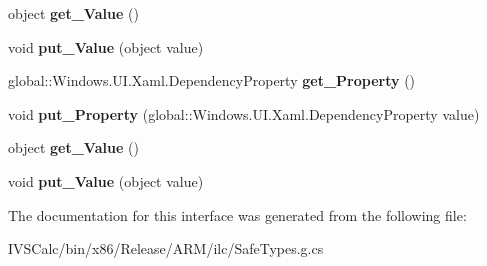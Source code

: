 \begin{DoxyCompactItemize}
object {\bfseries get\+\_\+\+Value} ()
\item 
\mbox{\label{interface_windows_1_1_u_i_1_1_xaml_1_1_i_setter_a222ce9a11d2ca442e2176a98682d4ff0}} 
void {\bfseries put\+\_\+\+Value} (object value)
\item 
\mbox{\label{interface_windows_1_1_u_i_1_1_xaml_1_1_i_setter_a3caf5fdfe02e38278e49afff4712f70c}} 
global\+::\+Windows.\+U\+I.\+Xaml.\+Dependency\+Property {\bfseries get\+\_\+\+Property} ()
\item 
\mbox{\label{interface_windows_1_1_u_i_1_1_xaml_1_1_i_setter_ab28bb64021366fee0d6ff823631c77ba}} 
void {\bfseries put\+\_\+\+Property} (global\+::\+Windows.\+U\+I.\+Xaml.\+Dependency\+Property value)
\item 
\mbox{\label{interface_windows_1_1_u_i_1_1_xaml_1_1_i_setter_a6f3c52ea80a2e55872c6f70db27a650d}} 
object {\bfseries get\+\_\+\+Value} ()
\item 
\mbox{\label{interface_windows_1_1_u_i_1_1_xaml_1_1_i_setter_a222ce9a11d2ca442e2176a98682d4ff0}} 
void {\bfseries put\+\_\+\+Value} (object value)
\end{DoxyCompactItemize}


The documentation for this interface was generated from the following file\+:\begin{DoxyCompactItemize}
\item 
I\+V\+S\+Calc/bin/x86/\+Release/\+A\+R\+M/ilc/Safe\+Types.\+g.\+cs\end{DoxyCompactItemize}
